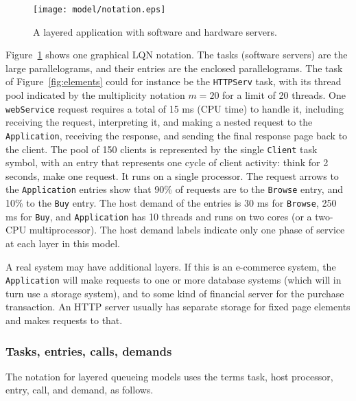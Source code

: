 \documentclass[11pt]{article}
\begin{document}
\begin{figure}
  \centering
  \texttt{[image: model/notation.eps]}
  \caption{A layered application with software and hardware servers.}
  \label{fig:notation}
\end{figure}

Figure~\ref{fig:notation} shows one graphical LQN notation. The tasks (software servers) are the
large parallelograms, and their entries are the enclosed parallelograms. The task of Figure~\ref{fig:elements} could for
instance be the \texttt{HTTPServ} task, with its thread pool indicated by the multiplicity notation $m=20$
for a limit of 20 threads. One \texttt{webService} request requires a total of 15 ms (CPU time) to
handle it, including receiving the request, interpreting it, and making a nested request to the
\texttt{Application}, receiving the response, and sending the final response page back to the
client. The pool of 150 clients is represented by the single \texttt{Client} task symbol, with an entry
that represents one cycle of client activity: think for 2 seconds, make one request. It runs on
a single processor. The request arrows to the \texttt{Application} entries show that 90\% of requests
are to the \texttt{Browse} entry, and 10\% to the \texttt{Buy} entry. The host demand of the entries is 30 ms for
\texttt{Browse}, 250 ms for \texttt{Buy}, and \texttt{Application} has 10 threads and runs on two cores (or a two-CPU
multiprocessor). The host demand labels indicate only one phase of service at each layer in
this model.

A real system may have additional layers. If this is an e-commerce system, the \texttt{Application}
will make requests to one or more database systems (which will in turn use a storage system), and
to some kind of financial server for the purchase transaction. An HTTP server usually has separate
storage for fixed page elements and makes requests to that.

\subsubsection{Tasks, entries, calls, demands}
\label{sec:tasks-entries-calls-demands}

The notation for layered queueing models uses the terms task, host processor, entry, call, 
and demand, as follows.
\end{document}
